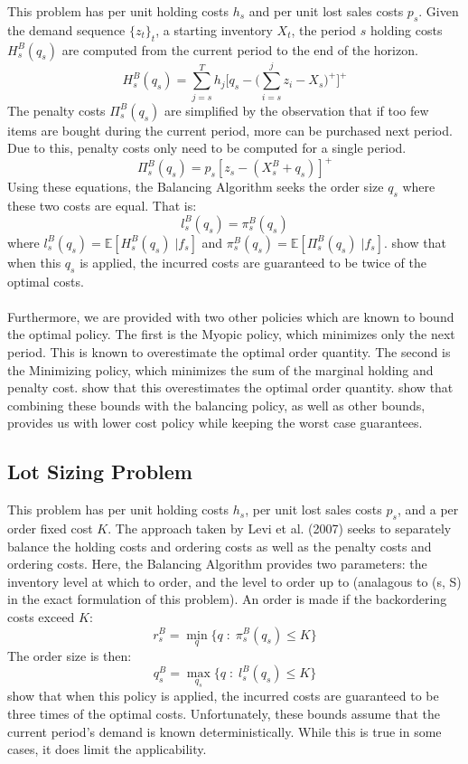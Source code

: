 \documentclass[12pt]{article}
\newcommand{\EX}{\mathbb{E}}
\begin{document}
This problem has per unit holding costs $h_s$ and per unit lost sales costs $p_s$. Given the demand sequence $\{z_t\}_t$, a starting inventory $X_t$, the period $s$ holding costs $H^B_s(q_s)$ are computed from the current period to the end of the horizon. 
$$
	H_s^B(q_s) = \sum_{j=s}^T h_j \big[q_s - \big(\sum_{i=s}^j z_i - X_s\big)^+\big]^+
$$
The penalty costs $\Pi_s^B(q_s)$ are simplified by the observation that if too few items are bought during the current period, more can be purchased next period. Due to this, penalty costs only need to be computed for a single period.
$$
	\Pi_s^B(q_s) =  p_s [z_s - (X_s^B + q_s)]^+ 
$$
Using these equations, the Balancing Algorithm seeks the order size $q_s$ where these two costs are equal. That is:
$$
	l_s^B(q_s) = \pi_s^B(q_s)
$$
where $l_s^B(q_s) = \EX[H_s^B(q_s) \; | f_s]$ and $\pi_s^B(q_s) = \EX[\Pi_s^B(q_s) \; | f_s]$. \cite{levi:2007} show that when this $q_s$ is applied, the incurred costs are guaranteed to be twice of the optimal costs. \\
\\
Furthermore, we are provided with two other policies which are known to bound the optimal policy. The first is the Myopic policy, which minimizes only the next period. This is known to overestimate the optimal order quantity. The second is the Minimizing policy, which minimizes the sum of the marginal holding and penalty cost. \cite{levi:2007} show that this overestimates the optimal order quantity. \cite{hurley:2007} show that combining these bounds with the balancing policy, as well as other bounds, provides us with lower cost policy while keeping the worst case guarantees.  

\subsection{Lot Sizing Problem}

This problem has per unit holding costs $h_s$, per unit lost sales costs $p_s$, and a per order fixed cost $K$. The approach taken by Levi et al. (2007) seeks to separately balance the holding costs and ordering costs as well as the penalty costs and ordering costs. Here, the Balancing Algorithm provides two parameters: the inventory level at which to order, and the level to order up to (analagous to (s, S) in the exact formulation of this problem). An order is made if the backordering costs exceed $K$:
$$
	r_s^B = \min_{q} \{q \; : \; \pi_s^B(q_s) \leq K\} 
$$
The order size is then:
$$
	q_s^B = \max_{q_s} \{q \; : \; l_s^B(q_s) \leq K\} 
$$
\cite{levi:2007} show that when this policy is applied, the incurred costs are guaranteed to be three times of the optimal costs. Unfortunately, these bounds assume that the current period's demand is known deterministically. While this is true in some cases, it does limit the applicability.
\end{document}
